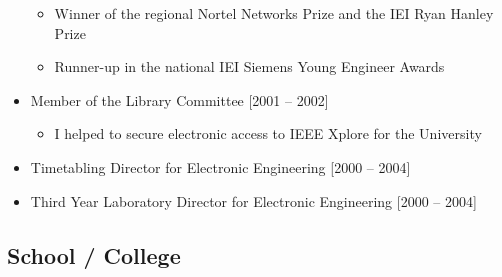 \documentclass[10pt,a4paper]{res} %
\begin{document}
\begin{resume}
\begin{itemize}
\begin{itemize} \itemsep -2pt
\item Winner of the regional Nortel Networks Prize and the IEI Ryan Hanley Prize
\item Runner-up in the national IEI Siemens Young Engineer Awards
\end{itemize}
\item Member of the Library Committee [2001 -- 2002]
\begin{itemize} \itemsep -2pt
\item I helped to secure electronic access to IEEE Xplore for the University
\end{itemize}
\item Timetabling Director for Electronic Engineering [2000 -- 2004]
\item Third Year Laboratory Director for Electronic Engineering [2000 -- 2004]
\end{itemize}

\subsection*{School / College}


\end{resume}
\end{document}
